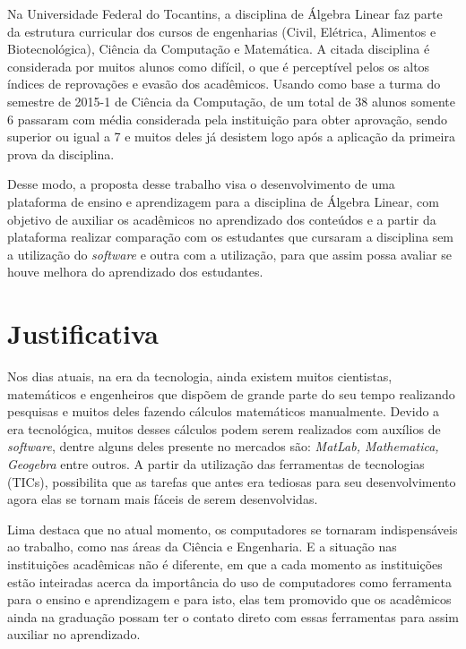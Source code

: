 Na Universidade Federal do Tocantins, a disciplina de Álgebra Linear faz parte da estrutura curricular dos cursos de engenharias (Civil, Elétrica, Alimentos e Biotecnológica), Ciência da Computação e Matemática. A citada disciplina é considerada por muitos alunos como difícil, o que é perceptível pelos os altos índices de reprovações e evasão dos acadêmicos. Usando como base a turma do semestre de 2015-1 de Ciência da Computação, de um total de 38 alunos somente 6 passaram com média considerada pela instituição para obter aprovação, sendo superior ou igual a 7 e muitos deles já desistem logo após a aplicação da primeira prova da disciplina.  

Desse modo, a proposta desse trabalho visa o desenvolvimento de uma plataforma de ensino e aprendizagem para a disciplina de Álgebra Linear, com objetivo de auxiliar os acadêmicos no aprendizado dos conteúdos e a partir da plataforma realizar comparação com os estudantes que cursaram a disciplina sem a utilização do \textit{software} e outra com a utilização, para que assim possa avaliar se houve melhora do aprendizado dos estudantes.

\section{Justificativa}

\noindent Nos dias atuais, na era da tecnologia, ainda existem muitos cientistas, matemáticos e engenheiros que dispõem de grande parte do seu tempo realizando pesquisas e muitos deles fazendo cálculos matemáticos manualmente. Devido a era tecnológica, muitos desses cálculos podem serem realizados com auxílios de \textit{software}, dentre alguns deles presente no mercados são: \textit{MatLab, Mathematica, Geogebra} entre outros. A partir da utilização das ferramentas de tecnologias (TICs), possibilita que as tarefas que antes era tediosas para seu desenvolvimento agora elas se tornam mais fáceis de serem desenvolvidas.

Lima \cite{2000:lima} destaca que no atual momento, os computadores se tornaram indispensáveis ao trabalho, como nas áreas da Ciência e Engenharia. E a situação nas instituições acadêmicas não é diferente, em que a cada momento as instituições estão inteiradas acerca da importância do uso de computadores como ferramenta para o ensino e aprendizagem e para isto, elas tem promovido que os acadêmicos ainda na graduação possam ter o contato direto com essas ferramentas para assim auxiliar no aprendizado.

